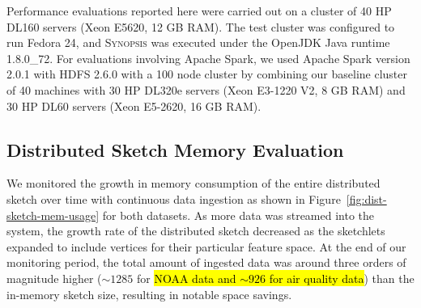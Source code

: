 Performance evaluations reported here were carried out on a cluster of 40 HP DL160 servers (Xeon E5620, 12 GB RAM). The test cluster was configured to run Fedora 24, and \textsc{Synopsis} was executed under the OpenJDK Java runtime 1.8.0\_72.
For evaluations involving Apache Spark, we used Apache Spark version 2.0.1 with HDFS 2.6.0 with a 100 node cluster by combining our baseline cluster of 40 machines with 30 HP DL320e servers (Xeon E3-1220 V2, 8 GB RAM) and 30 HP DL60 servers (Xeon E5-2620, 16 GB RAM). 


\subsection{Distributed Sketch Memory Evaluation}
We monitored the growth in memory consumption of the entire distributed sketch over time with continuous data ingestion as shown in Figure~\ref{fig:dist-sketch-mem-usage} for both datasets. As more data was streamed into the system, the growth rate of the distributed sketch decreased as the sketchlets expanded to include vertices for their particular feature space.  At the end of our monitoring period, the total amount of ingested data was around three orders of magnitude higher ($\sim 1285$ for \hl{NOAA data and $\sim 926$ for air quality data}) than the in-memory sketch size, resulting in notable space savings.
%
